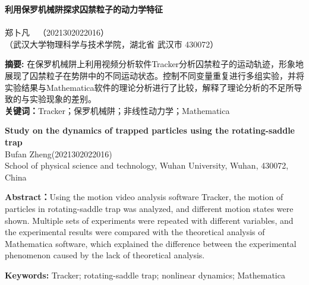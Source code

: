 \documentclass{WHUReport}
\newcommand{\name}{郑卜凡}
\newcommand{\stuid}{2021302022016}
\newcommand{\Name}{Bufan Zheng}
\newcommand{\newtitle}{利用保罗机械阱探求囚禁粒子的动力学特征}
\newcommand{\Title}{Study on the dynamics of trapped particles using the rotating-saddle trap}
\begin{document}
\pagestyle{maincontent} 


\begin{center}
 \textbf{\newtitle}\\
~\\
 \kaishu \name \ \ （\stuid）\\
 \kaishu （武汉大学物理科学与技术学院，湖北省 武汉市 430072）\\
\end{center}
\textbf{摘\quad 要:}
在保罗机械阱上利用视频分析软件Tracker分析囚禁粒子的运动轨迹，形象地展现了囚禁粒子在势阱中的不同运动状态。控制不同变量重复进行多组实验，并将实验结果与Mathematica软件的理论分析进行了比较，解释了理论分析的不足所导致的与实验现象的差别。\\
\textbf{关键词：}Tracker；保罗机械阱；非线性动力学；Mathematica
~\\
\begin{center}
	\textbf{\Title}\\
	 \Name\quad (\stuid)\\
	 School of physical science and technology, Wuhan University, Wuhan, 430072, China
\end{center}

\textbf{Abstract：}Using the motion video analysis software Tracker, the motion of particles in rotating-saddle trap was analyzed, and different motion states were shown. Multiple sets of experiments were repeated with different variables, and the experimental results were compared with the theoretical analysis of Mathematica software, which explained the difference between the experimental phenomenon caused by the lack of theoretical analysis.

\textbf{Keywords: }Tracker; rotating-saddle trap; nonlinear dynamics; Mathematica
\end{document}
